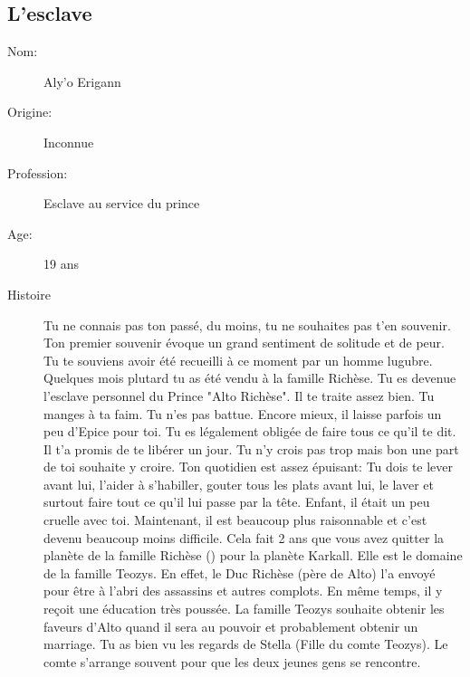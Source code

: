\documentclass[oneside,12pt]{book}
\begin{document}
\begin{flushleft}
\section{L'esclave}
\begin{description}
\item[Nom:]{Aly'o Erigann}
\item[Origine:]{Inconnue}
\item[Profession:]{Esclave au service du prince}
\item[Age:]{19 ans}
\item[Histoire]{ 
Tu ne connais pas ton passé, du moins, tu ne souhaites pas t'en souvenir. 
Ton premier souvenir évoque un grand sentiment de solitude et de peur. Tu te souviens avoir été recueilli à ce moment par un homme lugubre. Quelques mois plutard tu as été vendu à la famille Richèse. Tu es devenue l'esclave personnel du Prince "Alto Richèse". Il te traite assez bien. Tu manges à ta faim. Tu n'es pas battue. Encore mieux, il laisse parfois un peu d'Epice pour toi. Tu es légalement obligée de faire tous ce qu'il te dit. Il t'a promis de te libérer un jour. Tu n'y crois pas trop mais bon
une part de toi souhaite y croire. Ton quotidien est assez épuisant: Tu dois te lever avant lui, l'aider à s'habiller, gouter tous les plats avant lui, le laver et surtout faire tout ce qu'il lui passe par la tête. 
Enfant, il était un peu cruelle avec toi. Maintenant, il est beaucoup plus raisonnable et c'est devenu beaucoup moins difficile. 
Cela fait 2 ans que vous avez quitter la planète de la famille Richèse () pour la planète Karkall. 
Elle est le domaine de la famille Teozys. En effet, le Duc Richèse (père de Alto) l'a envoyé pour être à l'abri des assassins et autres complots. 
En même temps, il y reçoit une éducation très poussée. La famille Teozys souhaite obtenir les faveurs d'Alto quand il sera au pouvoir et probablement obtenir un marriage. 
Tu as bien vu les regards de Stella (Fille du comte Teozys). Le comte s'arrange souvent pour que les deux jeunes gens se rencontre. \\

}
\end{description}
\end{flushleft}
\end{document}
